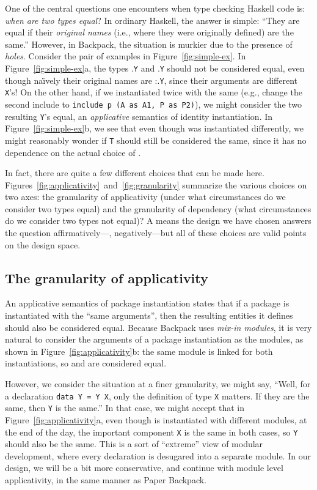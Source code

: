 \documentclass{article}
\begin{document}
One of the central questions one encounters when type checking Haskell
code is: \emph{when are two types equal}?  In ordinary Haskell, the
answer is simple: ``They are equal if their \emph{original names} (i.e.,
where they were originally defined) are the same.''  However, in
Backpack, the situation is murkier due to the presence of \emph{holes}.
Consider the pair of examples in Figure~\ref{fig:simple-ex}.
In Figure~\ref{fig:simple-ex}a,  the types .\verb|Y| and .\verb|Y| should not be
considered equal, even though na\"\i vely their original names are
:.\verb|Y|, since their arguments are different \verb|X|'s!
On the other hand, if we instantiated  twice with the same 
(e.g., change the second include to \texttt{include p (A as A1, P as P2)}),
we might consider the two resulting \verb|Y|'s
equal, an \emph{applicative} semantics of identity instantiation.  In
Figure~\ref{fig:simple-ex}b, we see that even though  was instantiated differently,
we might reasonably wonder if \texttt{T} should still be considered the same,
since it has no dependence on the actual choice of .

In fact, there are quite a few different choices that can be made here.
Figures~\ref{fig:applicativity}~and~\ref{fig:granularity} summarize the various
choices on two axes: the granularity of applicativity (under what circumstances
do we consider two types equal) and the granularity of dependency (what circumstances
do we consider two types not equal)?  A  means the design we have chosen
answers the question affirmatively---, negatively---but all of these choices
are valid points on the design space.

\subsection{The granularity of applicativity}

An applicative semantics of package instantiation states that if a package is
instantiated with the ``same arguments'', then the resulting entities it defines
should also be considered equal.  Because Backpack uses \emph{mix-in modules},
it is very natural to consider the arguments of a package instantiation as the
modules, as shown in Figure~\ref{fig:applicativity}b: the same module  is
linked for both instantiations, so  and  are considered equal.

However, we consider the situation at a finer granularity, we might say, ``Well,
for a declaration \texttt{data Y = Y X}, only the definition of type \verb|X| matters.
If they are the same, then \verb|Y| is the same.''  In that case, we might accept
that in Figure~\ref{fig:applicativity}a, even though  is instantiated
with different modules, at the end of the day, the important component \verb|X| is
the same in both cases, so \verb|Y| should also be the same.  This is a sort of
``extreme'' view of modular development, where every declaration is desugared
into a separate module.  In our design, we will be a bit more conservative, and
continue with module level applicativity, in the same manner as Paper Backpack.
\end{document}

